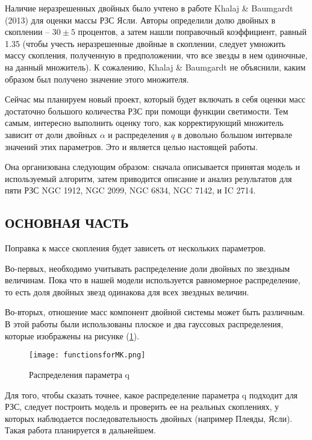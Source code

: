 \documentclass[a4paper,12pt]{article}
\begin{document}
Наличие неразрешенных двойных было учтено в работе Khalaj \& Baumgardt (2013) \cite{Khalaj} для оценки массы РЗС Ясли. Авторы определили долю двойных в скоплении -- $30\pm5$ процентов, а затем нашли поправочный коэффициент, равный 1.35 (чтобы учесть неразрешенные двойные в скоплении, следует умножить массу скопления, полученную в предположении, что все звезды в нем одиночные, на данный множитель). 
К сожалению, Khalaj \& Baumgardt \cite{Khalaj} не объяснили, каким образом был получено значение этого множителя. 

Сейчас мы планируем новый проект, который будет включать в себя оценки масс достаточно большого количества РЗС при помощи функции светимости. Тем самым, интересно выполнить оценку того, как корректирующий множитель зависит от доли двойных $\alpha$ и распределения $q$ в довольно большом интервале значений этих параметров. Это и является целью настоящей работы.

Она организована следующим образом: сначала  описывается принятая модель и используемый алгоритм, затем приводится описание и анализ результатов для пяти РЗС NGC 1912, NGC 2099, NGC 6834, NGC 7142, и IC 2714. 
 \newpage

\begin{center}
\section{ОСНОВНАЯ ЧАСТЬ}
\end{center}

Поправка к массе скопления будет зависеть от нескольких параметров.

Во-первых, необходимо учитывать распределение доли двойных по звездным величинам. Пока что в нашей модели используется равномерное распределение, то есть доля двойных звезд одинакова для всех звездных величин.

Во-вторых, отношение масс компонент двойной системы может быть различным. 
В этой работы были использованы плоское и два гауссовых распределения, которые изображены на рисунке (\ref{Funcs}).

\begin{figure}[h!]\centering
\texttt{[image: functionsforMK.png]}
\caption{Распределения параметра q}
\label{Funcs}
\end{figure}

Для того, чтобы сказать точнее, какое распределение параметра q подходит для РЗС, следует построить модель и проверить ее на реальных скоплениях, у которых наблюдается последовательность двойных (например Плеяды, Ясли). Такая работа  планируется в дальнейшем.
\end{document}
